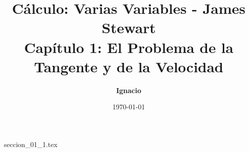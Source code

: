 \documentclass[11pt,spanish,oneside]{report}
\title{\textbf{Cálculo: Varias Variables - James Stewart} \\ \Large Capítulo 1: El Problema de la Tangente y de la Velocidad}
\author{\textbf{Ignacio}}
\date{\today}
\begin{document}
\maketitle

{seccion_01_1.tex}
\end{document}
